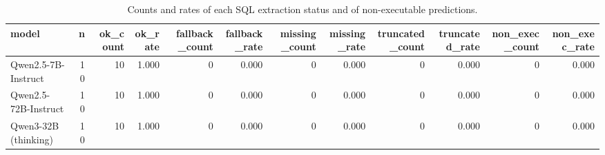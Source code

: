 \begin{table}[htbp]
\caption{Counts and rates of each SQL extraction status and of non-executable predictions.}
\label{tab:task1_invalid}
\begin{tabular}{lrrrrrrrrrrr}
\toprule
model & n & ok\_count & ok\_rate & fallback\_count & fallback\_rate & missing\_count & missing\_rate & truncated\_count & truncated\_rate & non\_exec\_count & non\_exec\_rate \\
\midrule
Qwen2.5-7B-Instruct & 10 & 10 & 1.000 & 0 & 0.000 & 0 & 0.000 & 0 & 0.000 & 0 & 0.000 \\
Qwen2.5-72B-Instruct & 10 & 10 & 1.000 & 0 & 0.000 & 0 & 0.000 & 0 & 0.000 & 0 & 0.000 \\
Qwen3-32B (thinking) & 10 & 10 & 1.000 & 0 & 0.000 & 0 & 0.000 & 0 & 0.000 & 0 & 0.000 \\
\bottomrule
\end{tabular}
\end{table}
